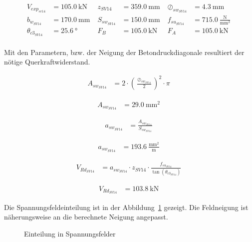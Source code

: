 \documentclass[
  11pt,
  letterpaper,
]{scrreprt}
\begin{document}
$$
\begin{aligned}
V_{exp_{sv14}} &= 105.0\ \mathrm{kN} \; 
 &z_{SV14} &= 359.0\ \mathrm{mm} \; 
 &\oslash_{sw_{SV14}} &= 4.3\ \mathrm{mm} \; 
\\[12pt]
 b_{w_{SV14}} &= 170.0\ \mathrm{mm} \; 
 &S_{sw_{SV14}} &= 150.0\ \mathrm{mm} \; 
 &f_{su_{SV14}} &= 715.0\ \frac{\mathrm{N}}{\mathrm{mm}^{2}} \; 
\\[12pt]
 \theta_{c3_{SV14}} &= 25.6\ \mathrm{°} \; 
 &F_{B} &= 105.0\ \mathrm{kN} \; 
 &F_{A} &= 105.0\ \mathrm{kN} \; 
\\[12pt]
\end{aligned}
$$

Mit den Parametern, bzw. der Neigung der Betondruckdiagonale resultiert
der nötige Querkraftwiderstand.

$$
\begin{aligned}
A_{sw_{SV14}} &= 2 \cdot \left( \frac{ \oslash_{sw_{SV14}} }{ 2 } \right) ^{ 2 } \cdot \pi \; 
\end{aligned}
$$

$$
\begin{aligned}
A_{sw_{SV14}} &= 29.0\ \mathrm{mm}^{2} \;
\end{aligned}
$$

$$
\begin{aligned}
a_{sw_{SV14}} &= \frac{ A_{sw_{SV14}} }{ S_{sw_{SV14}} } \; 
\end{aligned}
$$

$$
\begin{aligned}
a_{sw_{SV14}} &= 193.6\ \frac{\mathrm{mm}^{2}}{\mathrm{m}} \;
\end{aligned}
$$

$$
\begin{aligned}
V_{Rd_{SV14}} &= a_{sw_{SV14}} \cdot z_{SV14} \cdot \frac{ f_{su_{SV14}} }{ \tan \left( \theta_{c3_{SV14}} \right) } \; 
\end{aligned}
$$

$$
\begin{aligned}
V_{Rd_{SV14}} &= 103.8\ \mathrm{kN} \;
\end{aligned}
$$

Die Spannungsfeldeinteilung ist in der
Abbildung~\ref{fig-spannungsfelder_sv14} gezeigt. Die Feldneigung ist
näherungsweise an die berechnete Neigung angepasst.

\begin{figure}[H]


\caption{\label{fig-spannungsfelder_sv14}Einteilung in Spannungsfelder}

\end{figure}%
\end{document}
